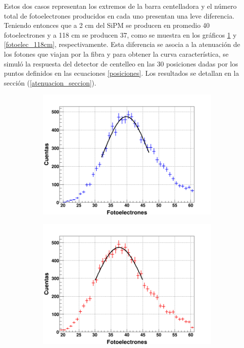 \documentclass[12pt,oneside,openany,letter]{book}
\begin{document}
Estos dos casos representan los extremos de la barra centelladora y el número total de fotoelectrones producidos en cada uno presentan una leve diferencia. Teniendo entonces que a 2 cm del SiPM se producen en promedio 40 fotoelectrones y a 118 cm se producen 37, como se muestra en los gráficos \ref{fotoelec_2cm} y \ref{fotoelec_118cm}, respectivamente. Esta diferencia se asocia a la atenuación de los fotones que viajan por la fibra y para obtener la curva característica, se simuló la respuesta del detector de centelleo en las 30 posiciones dadas por los puntos definidos en las ecuaciones \ref{posiciones}. Los resultados se detallan en la sección (\ref{atenuacion_seccion}).
\begin{figure}[h!]
    \centering
    \begin{subfigure}{0.6\textwidth}
        \includegraphics[width=\textwidth]{images/fotoelec_2cm.png}
        \caption{}
        \label{fotoelec_2cm}
    \end{subfigure}
    \begin{subfigure}{0.6\textwidth}
        \includegraphics[width=\textwidth]{images/fotoelec_118cm.png}

\end{subfigure}
\end{figure}
\end{document}

